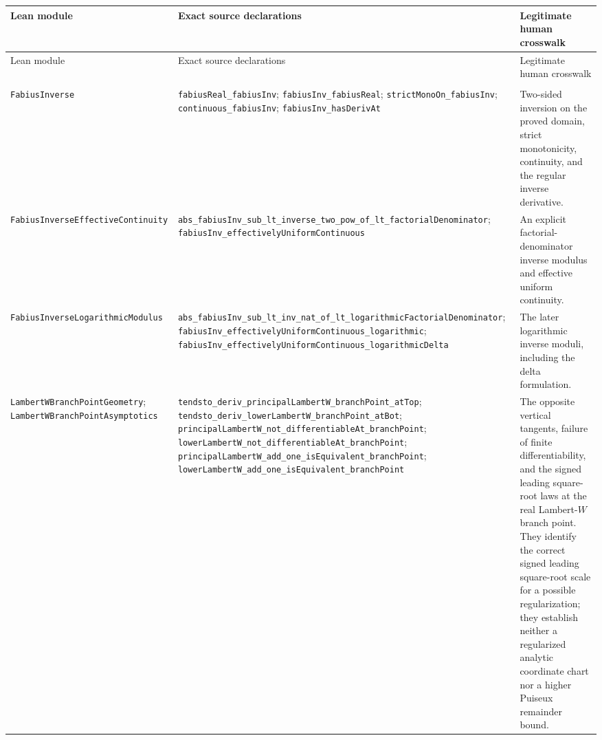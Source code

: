 \begingroup
\small
\setlength{\tabcolsep}{4pt}
\renewcommand{\arraystretch}{1.18}
\begin{longtable}{@{}>{\raggedright\arraybackslash}p{}>{\raggedright\arraybackslash}p{}>{\raggedright\arraybackslash}p{}@{}}
\toprule
Lean module & Exact source declarations & Legitimate human crosswalk \\
\midrule
\endfirsthead
\toprule
Lean module & Exact source declarations & Legitimate human crosswalk \\
\midrule
\endhead
\midrule
\multicolumn{3}{r@{}}{\small\itshape Continued on the next page}\\
\endfoot
\bottomrule
\endlastfoot
\nolinkurl{FabiusInverse}
&
\nolinkurl{fabiusReal_fabiusInv};
\nolinkurl{fabiusInv_fabiusReal};
\nolinkurl{strictMonoOn_fabiusInv};
\nolinkurl{continuous_fabiusInv};
\nolinkurl{fabiusInv_hasDerivAt}
&
Two-sided inversion on the proved domain, strict monotonicity, continuity,
and the regular inverse derivative. \\

\nolinkurl{FabiusInverseEffectiveContinuity}
&
\nolinkurl{abs_fabiusInv_sub_lt_inverse_two_pow_of_lt_factorialDenominator};
\nolinkurl{fabiusInv_effectivelyUniformContinuous}
&
An explicit factorial-denominator inverse modulus and effective uniform
continuity. \\

\nolinkurl{FabiusInverseLogarithmicModulus}
&
\nolinkurl{abs_fabiusInv_sub_lt_inv_nat_of_lt_logarithmicFactorialDenominator};
\nolinkurl{fabiusInv_effectivelyUniformContinuous_logarithmic};
\nolinkurl{fabiusInv_effectivelyUniformContinuous_logarithmicDelta}
&
The later logarithmic inverse moduli, including the delta formulation. \\

\nolinkurl{LambertWBranchPointGeometry};
\nolinkurl{LambertWBranchPointAsymptotics}
&
\nolinkurl{tendsto_deriv_principalLambertW_branchPoint_atTop};
\nolinkurl{tendsto_deriv_lowerLambertW_branchPoint_atBot};
\nolinkurl{principalLambertW_not_differentiableAt_branchPoint};
\nolinkurl{lowerLambertW_not_differentiableAt_branchPoint};
\nolinkurl{principalLambertW_add_one_isEquivalent_branchPoint};
\nolinkurl{lowerLambertW_add_one_isEquivalent_branchPoint}
&
The opposite vertical tangents, failure of finite differentiability, and the
signed leading square-root laws at the real Lambert-\(W\) branch point.  They
identify the correct signed leading square-root scale for a possible
regularization; they establish neither a regularized analytic coordinate
chart nor a higher Puiseux remainder bound. \\


\end{longtable}
